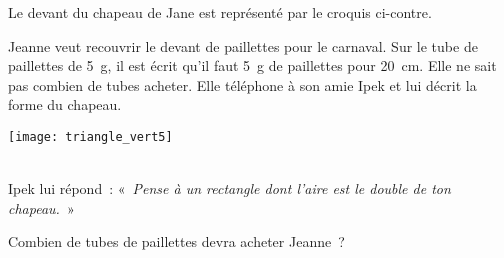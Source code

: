 
\begin{activite}

\begin{partie}
\begin{minipage}[c]{0.56\linewidth}
Le devant du chapeau de Jane est représenté par le croquis ci-contre.

Jeanne veut recouvrir le devant de paillettes pour le carnaval. Sur le tube de paillettes de 5 g, il est écrit qu'il faut 5 g de paillettes pour 20 cm. Elle ne sait pas combien de tubes acheter. Elle téléphone à son amie Ipek et lui décrit la forme du chapeau.
 \end{minipage} \hfill%
 \begin{minipage}[c]{0.4\linewidth}
  \texttt{[image: triangle\_vert5]}
  \end{minipage} \\
  
Ipek lui répond : « \emph{Pense à un rectangle dont l'aire est le double de ton chapeau.} »

Combien de tubes de paillettes devra acheter Jeanne ?
\end{partie}


\end{activite}
